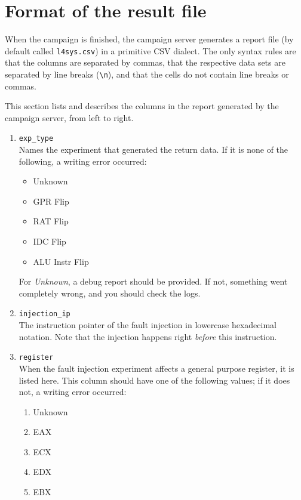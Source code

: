 \documentclass[a4paper,10pt]{article}
\begin{document}
\section{Format of the result file}

When the campaign is finished, the campaign server generates a report
file (by default called \texttt{l4sys.csv}) in a primitive CSV dialect.
The only syntax rules are that the columns are separated by commas,
that the respective data sets are separated by line breaks (\verb+\n+),
and that the cells do not contain line breaks or commas.

This section lists and describes the columns in the report generated by
the campaign server, from left to right.

\begin{enumerate}
 \item \verb+exp_type+\\
       Names the experiment that generated the return data.
       If it is none of the following, a writing error occurred:
       \begin{itemize}
        \item Unknown
        \item GPR Flip
        \item RAT Flip
        \item IDC Flip
        \item ALU Instr Flip
       \end{itemize}
       For \emph{Unknown}, a debug report should be provided.
       If not, something went completely wrong, and you should
       check the logs.
 \item \verb+injection_ip+\\
       The instruction pointer of the fault injection
       in lowercase hexadecimal notation.
       Note that the injection happens right \emph{before} this
       instruction.
 \item \verb+register+\\
       When the fault injection experiment affects a general purpose register,
       it is listed here. This column should have one of the following values;
       if it does not, a writing error occurred:
       \begin{enumerate}
        \item Unknown
        \item EAX
        \item ECX
        \item EDX
        \item EBX

\end{enumerate}
\end{enumerate}
\end{document}
